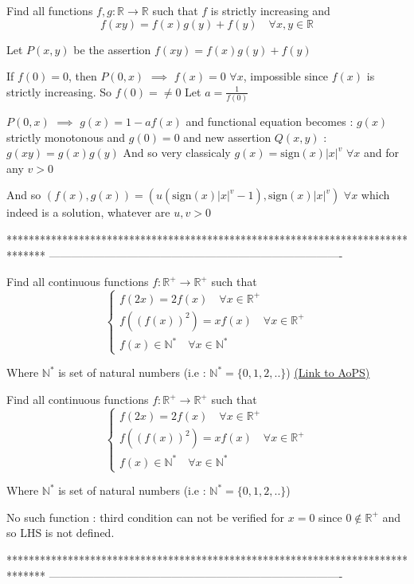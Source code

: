 \begin{solution}
	\begin{tcolorbox}Find all functions $f,g:\mathbb{R}\to\mathbb{R}$ such that $f$ is strictly increasing and \[f(xy)=f(x)g(y)+f(y)\quad \forall x,y\in \mathbb{R}\]\end{tcolorbox}
Let $P(x,y)$ be the assertion $f(xy)=f(x)g(y)+f(y)$

If $f(0)=0$, then $P(0,x)$ $\implies$ $f(x)=0$ $\forall x$, impossible since $f(x)$ is strictly increasing. So $f(0)=\ne 0$
Let $a=\frac 1{f(0)}$

$P(0,x)$ $\implies$ $g(x)=1-af(x)$ and functional equation becomes :
$g(x)$ strictly monotonous and $g(0)=0$ and new assertion $Q(x,y)$ : $g(xy)=g(x)g(y)$
And so very classicaly $g(x)=\text{sign}(x)|x|^v$ $\forall x$ and for any $v>0$

And so $\boxed{(f(x),g(x))=\left(u(\text{sign}(x)|x|^v-1),\text{sign}(x)|x|^v\right)}$ $\forall x$ which indeed is a solution, whatever are $u,v>0$
\end{solution}
*******************************************************************************
-------------------------------------------------------------------------------

\begin{problem}
	Find all continuous functions $f:\mathbb{R}^+\to\mathbb{R}^+$ such that 
\[\begin{cases}f(2x)=2f(x)\quad \forall x\in \mathbb{R}^+ \\ f((f(x))^2)=xf(x)\quad \forall x\in \mathbb{R}^+ \\ f(x)\in\mathbb{N}^*\quad \forall x\in \mathbb{N}^*\end{cases}\]

Where $ \mathbb{N}^*$ is set of natural numbers (i.e :  $\mathbb{N}^*=\{0,1,2,..\}$)
	\flushright \href{https://artofproblemsolving.com/community/c6h578362}{(Link to AoPS)}
\end{problem}



\begin{solution}
	\begin{tcolorbox}Find all continuous functions $f:\mathbb{R}^+\to\mathbb{R}^+$ such that 
\[\begin{cases}f(2x)=2f(x)\quad \forall x\in \mathbb{R}^+ \\ f((f(x))^2)=xf(x)\quad \forall x\in \mathbb{R}^+ \\ f(x)\in\mathbb{N}^*\quad \forall x\in \mathbb{N}^*\end{cases}\]

Where $ \mathbb{N}^*$ is set of natural numbers (i.e :  $\mathbb{N}^*=\{0,1,2,..\}$)\end{tcolorbox}
No such function : third condition can not be verified for $x=0$ since $0\notin\mathbb R^+$ and so LHS is not defined.
\end{solution}
*******************************************************************************
-------------------------------------------------------------------------------

